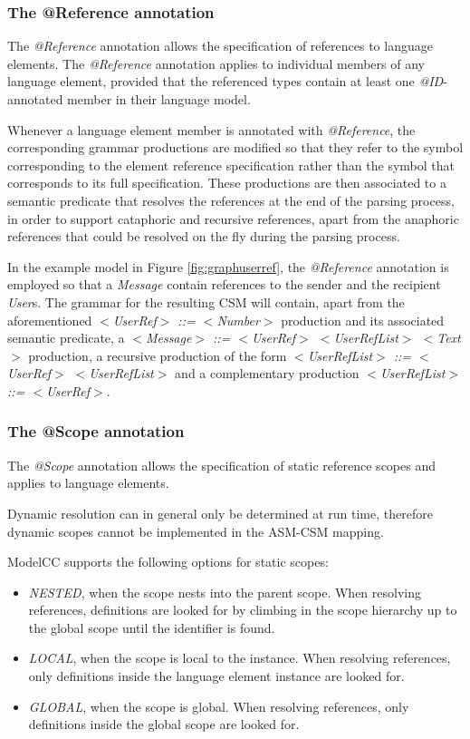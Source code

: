 \documentclass[a4paper,twoside,onecolumn]{article}
\newcommand{\etexttt}[1]{\textit{#1}}
\newcommand{\an}[1]{\emph{#1}} %
\begin{document}
\subsubsection{The @Reference annotation}

The \an{@Reference} annotation allows the specification of references to language elements.
The \an{@Reference} annotation applies to individual members of any language element, provided that the referenced types contain at least one \an{@ID}-annotated member in their language model.

Whenever a language element member is annotated with \emph{@Reference}, the corresponding grammar productions are modified so that they refer to the symbol corresponding to the element reference specification rather than the symbol that corresponds to its full specification.
These productions are then associated to a semantic predicate that resolves the references at the end of the parsing process, in order to support cataphoric and recursive references, apart from the anaphoric references that could be resolved on the fly during the parsing process.

In the example model in Figure \ref{fig:graphuserref}, the \an{@Reference} annotation is employed so that a \emph{Message} contain references to the sender and the recipient \emph{User}s. The grammar for the resulting CSM will contain, apart from the aforementioned \etexttt{$<$UserRef$>$ ::= $<$Number$>$} production and its associated semantic predicate, a \etexttt{$<$Message$>$ ::= $<$UserRef$>$ $<$UserRefList$>$ $<$Text$>$} production, a recursive production of the form \etexttt{$<$UserRefList$>$ ::= $<$UserRef$>$ $<$UserRefList$>$} and a complementary production \etexttt{$<$UserRefList$>$ ::= $<$UserRef$>$}.

\subsubsection{The @Scope annotation}

The \an{@Scope} annotation allows the specification of static reference scopes and applies to language elements.

Dynamic resolution can in general only be determined at run time, therefore dynamic scopes cannot be implemented in the ASM-CSM mapping.

ModelCC supports the following options for static scopes:

\begin{itemize}
\item \an{NESTED}, when the scope nests into the parent scope.
      When resolving references, definitions are looked for by climbing in the scope hierarchy up to the global scope until the identifier is found.
\item \an{LOCAL}, when the scope is local to the instance.
      When resolving references, only definitions inside the language element instance are looked for.
\item \an{GLOBAL}, when the scope is global.
      When resolving references, only definitions inside the global scope are looked for.
\end{itemize}
\end{document}
